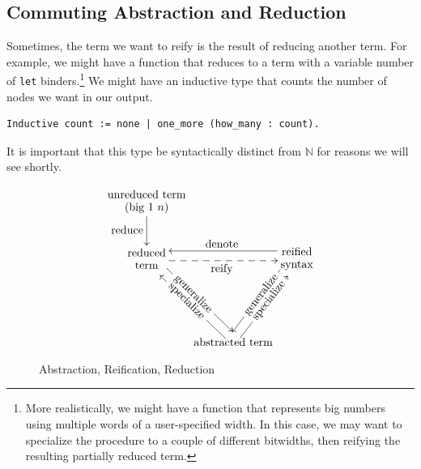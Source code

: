 \subsection{Commuting Abstraction and Reduction} \label{sec:commute-abstraction-reduction}
Sometimes, the term we want to reify is the result of reducing another term.
For example, we might have a function that reduces to a term with a variable number of \texttt{let} binders.\footnote{%
    More realistically, we might have a function that represents big numbers using multiple words of a user-specified width.
    In this case, we may want to specialize the procedure to a couple of different bitwidths, then reifying the resulting partially reduced term.%
}
We might have an inductive type that counts the number of \space nodes we want in our output.
\label{sec:count-def}
\begin{verbatim}
Inductive count := none | one_more (how_many : count).
\end{verbatim}
It is important that this type be syntactically distinct from $\mathbb N$ for reasons we will see shortly.

\begin{figure}
    \[
    \xymatrix@C=1pt{
        \txt{unreduced term \\ (big $1$ $n$)} \ar[d]_{\txt{\\reduce}} \\
        \txt{reduced \\ term}
        \ar@<1ex>[ddr]|{\txt{\rotatebox{-45}{generalize}}}
        \ar@<-1ex>@{-->}[rr]_{\txt{reify}}
        &&
        \txt{reified \\ syntax}
        \ar@<-1ex>[ll]_{\txt{denote}}
        \ar@<-1ex>[ddl]|{\txt{\rotatebox{52}{generalize}}}
        \\ \\
        &
        \txt{abstracted term}
        \ar@<1ex>[uul]|{\txt{\rotatebox{-45}{specialize}}}
        \ar@<-1ex>[uur]|{\txt{\rotatebox{52}{specialize}}}
    }
    \]
    \caption{Abstraction, Reification, Reduction} \label{fig:reduce-denote-reify}
\end{figure}


